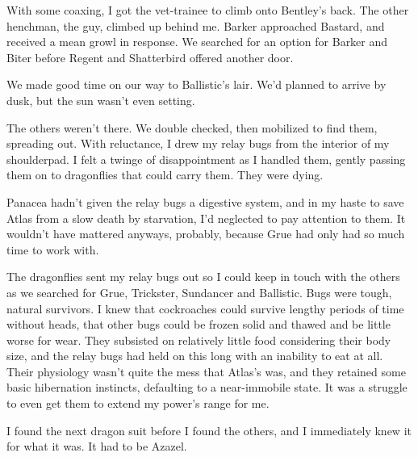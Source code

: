 With some coaxing, I got the vet-trainee to climb onto Bentley's back.  The other henchman, the guy, climbed up behind me.  Barker approached Bastard, and received a mean growl in response.  We searched for an option for Barker and Biter before Regent and Shatterbird offered another door.



We made good time on our way to Ballistic's lair.  We'd planned to arrive by dusk, but the sun wasn't even setting.



The others weren't there.  We double checked, then mobilized to find them, spreading out.  With reluctance, I drew my relay bugs from the interior of my shoulderpad.  I felt a twinge of disappointment as I handled them, gently passing them on to dragonflies that could carry them.  They were dying.



Panacea hadn't given the relay bugs a digestive system, and in my haste to save Atlas from a slow death by starvation, I'd neglected to pay attention to them.  It wouldn't have mattered anyways, probably, because Grue had only had so much time to work with.



The dragonflies sent my relay bugs out so I could keep in touch with the others as we searched for Grue, Trickster, Sundancer and Ballistic.  Bugs were tough, natural survivors.  I knew that cockroaches could survive lengthy periods of time without heads, that other bugs could be frozen solid and thawed and be little worse for wear.  They subsisted on relatively little food considering their body size, and the relay bugs had held on this long with an inability to eat at all.  Their physiology wasn't quite the mess that Atlas's was, and they retained some basic hibernation instincts, defaulting to a near-immobile state.  It was a struggle to even get them to extend my power's range for me.



I found the next dragon suit before I found the others, and I immediately knew it for what it was.  It had to be Azazel.





